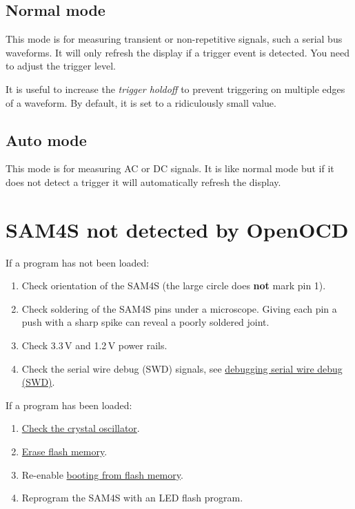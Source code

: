 \subsection{Normal mode}
\label{normal-mode}

This mode is for measuring transient or non-repetitive signals, such a
serial bus waveforms. It will only refresh the display if a trigger
event is detected.  You need to adjust the trigger level.

It is useful to increase the \emph{trigger holdoff} to prevent
triggering on multiple edges of a waveform.  By default, it is set to
a ridiculously small value.

\subsection{Auto mode}
\label{auto-mode}

This mode is for measuring AC or DC signals. It is like normal mode
but if it does not detect a trigger it will automatically refresh the
display.

\section{SAM4S not detected by OpenOCD}
\label{sam4s-not-detected-by-openocd}

If a program has not been loaded:

\begin{enumerate}
\item
  Check orientation of the SAM4S (the large circle does \textbf{not}
  mark pin 1).
\item
  Check soldering of the SAM4S pins under a microscope. Giving
  each pin a push with a sharp spike can reveal a poorly soldered joint.
\item
  Check 3.3\,V and 1.2\,V power rails.
\item
  Check the serial wire debug (SWD) signals, see
  \protect\hyperref[debugging]{debugging serial wire debug (SWD)}.
\end{enumerate}

If a program has been loaded:

\begin{enumerate}
\item  \protect\hyperref[checking-the-crystal-oscillator]{Check the
    crystal oscillator}.
  
\item \hyperref[erasing-flash-memory]{Erase flash memory}.
  
\item Re-enable \hyperref[booting-from-flash-memory]{booting from flash
  memory}.

\item  Reprogram the SAM4S with an LED flash program.
\end{enumerate}


